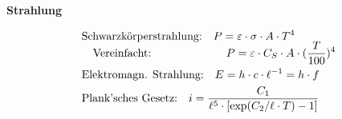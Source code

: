 \begin{minipage}[t]{.35\textwidth}
\vspace*{4mm}
\textbf{Strahlung} \par \vspace*{-4mm}
\begin{align*}
&\text{Schwarzkörperstrahlung:} \quad P = \varepsilon \cdot \sigma \cdot A \cdot T^4 \\[-6pt]
&\quad \text{Vereinfacht:} \hspace*{2cm} \quad P = \varepsilon \cdot C_S \cdot A \cdot (\frac{T}{100})^4 \\
&\text{Elektromagn. Strahlung:} \quad E = h \cdot c \cdot \ell^{-1} = h \cdot f \\
&\text{Plank'sches Gesetz:} \quad i = \frac{C_1}{\ell^5 \cdot [\text{exp}(C_2/\ell \cdot T)-1]}
\end{align*}
\end{minipage}%
\vfill
	
	
\pagebreak
\raggedbottom

